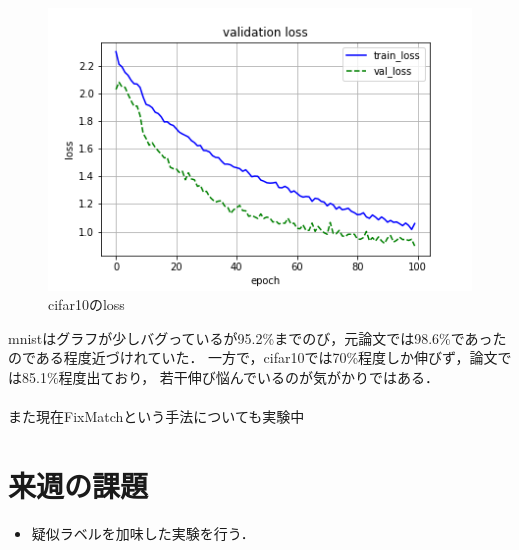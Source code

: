 \documentclass[twocolumn]{jarticle}     %
\begin{document}
\begin{figure}[ht]
	\centering	\includegraphics[scale=0.5]{loss_4.png}
	\caption{cifar10のloss\label{fig:graph4}}
\end{figure}

mnistはグラフが少しバグっているが95.2\%までのび，元論文では98.6\%であったのである程度近づけれていた．
一方で，cifar10では70\%程度しか伸びず，論文では85.1\%程度出ており，
若干伸び悩んでいるのが気がかりではある．
\\ \\
また現在FixMatchという手法についても実験中


\section{来週の課題}
\begin{itemize}
	\item 疑似ラベルを加味した実験を行う．
\end{itemize}
\end{document}
